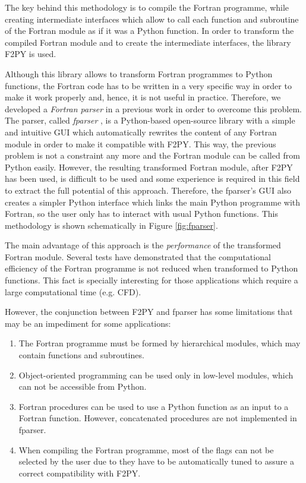 The key behind this methodology is to compile the Fortran programme, 
while creating intermediate interfaces which allow to call each function 
and subroutine of the Fortran module as if it was a Python function. 
In order to transform the compiled Fortran module and to create the 
intermediate interfaces, the library F2PY \cite{f2py} is used.

Although this library allows to transform Fortran programmes to Python functions, 
the Fortran code has to be written in a very specific way 
in order to make it work properly and, hence, 
it is not useful in practice. 
Therefore, we developed a \emph{Fortran parser} in a previous 
work in order to overcome this problem. The parser, called \emph{fparser} \cite{fparser}, 
is a Python-based open-source library with a simple 
and intuitive GUI which automatically rewrites the content of any Fortran module 
in order to make it compatible with F2PY. 
This way, the 
previous problem is not a constraint any more and the Fortran module can be called from Python easily. However, the resulting transformed 
Fortran module, after F2PY has been used, is difficult to be used and some experience is required in this field to extract the full potential 
of this approach. Therefore, the fparser's GUI also creates a simpler Python interface which links the main Python programme with Fortran, so 
the user only has to interact with usual Python functions. This methodology is shown schematically in Figure \ref{fig:fparser}.

The main advantage of this approach is the \emph{performance} of the transformed Fortran module. Several tests have demonstrated that the 
computational efficiency of the Fortran programme is not reduced when transformed to Python functions. This fact is specially interesting for 
those applications which require a large computational time (e.g. CFD).

However, the conjunction between F2PY and fparser has some limitations that may be an impediment for some applications:
\begin{enumerate}
    \item The Fortran programme must be formed by hierarchical modules, which may contain functions and subroutines.
    \item Object-oriented programming can be used only in low-level modules, which can not be accessible from Python.
    \item Fortran procedures can be used to use a Python function as an input to a Fortran function. However, concatenated procedures are not 
    implemented in fparser.
    \item When compiling the Fortran programme, most of the flags can not be selected by the user due to they have to be automatically tuned 
    to assure a correct compatibility with F2PY.
\end{enumerate}



